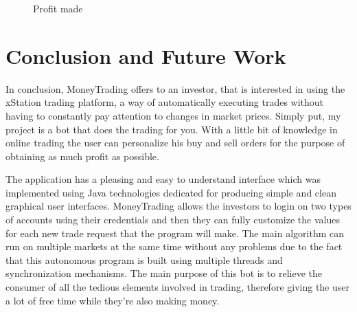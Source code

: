 \documentclass[12pt,a4paper]{report}
\begin{document}
\begin{figure}[!ht]
	\centering
	\qquad
	\caption{Profit made}
	\label{fig:profit}
\end{figure}


\chapter{Conclusion and Future Work}
In conclusion, MoneyTrading offers to an investor, that is interested in using the xStation trading platform, a way of automatically executing trades without having to constantly pay attention to changes in market prices. Simply put, my project is a bot that does the trading for you. With a little bit of knowledge in online trading the user can personalize his buy and sell orders for the purpose of obtaining as much profit as possible. 

The application has a pleasing and easy to understand interface which was implemented using Java technologies dedicated for producing simple and clean graphical user interfaces. MoneyTrading allows the investors to login on two types of accounts using their credentials and then they can fully customize the values for each new trade request that the program will make. The main algorithm can run on multiple markets at the same time without any problems due to the fact that this autonomous program is built using multiple threads and synchronization mechanisms. The main purpose of this bot is to relieve the consumer of all the tedious elements involved in trading, therefore giving the user a lot of free time while they're also making money.
\end{document}
